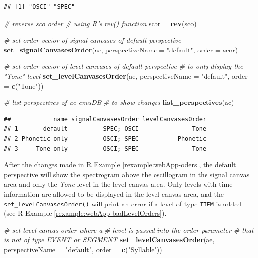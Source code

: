 \documentclass[]{book}
\newenvironment{Shaded}{\begin{snugshade}}{\end{snugshade}}
\newcommand{\CommentTok}[1]{\textcolor[rgb]{0.56,0.35,0.01}{\textit{#1}}}
\newcommand{\DataTypeTok}[1]{\textcolor[rgb]{0.13,0.29,0.53}{#1}}
\newcommand{\KeywordTok}[1]{\textcolor[rgb]{0.13,0.29,0.53}{\textbf{#1}}}
\newcommand{\NormalTok}[1]{#1}
\newcommand{\StringTok}[1]{\textcolor[rgb]{0.31,0.60,0.02}{#1}}
\theoremstyle{definition}
\theoremstyle{definition}
\theoremstyle{definition}
\theoremstyle{remark}
\begin{document}
\begin{verbatim}
## [1] "OSCI" "SPEC"
\end{verbatim}

\begin{Shaded}
\begin{Highlighting}[]
\CommentTok{# reverse sco order}
\CommentTok{# using R's rev() function}
\NormalTok{scor =}\StringTok{ }\KeywordTok{rev}\NormalTok{(sco)}

\CommentTok{# set order vector of signal canvases of default perspective}
\KeywordTok{set_signalCanvasesOrder}\NormalTok{(ae,}
                        \DataTypeTok{perspectiveName =} \StringTok{"default"}\NormalTok{,}
                        \DataTypeTok{order =}\NormalTok{ scor)}

\CommentTok{# set order vector of level canvases of default perspective}
\CommentTok{# to only display the "Tone" level}
\KeywordTok{set_levelCanvasesOrder}\NormalTok{(ae,}
                       \DataTypeTok{perspectiveName =} \StringTok{"default"}\NormalTok{,}
                       \DataTypeTok{order =} \KeywordTok{c}\NormalTok{(}\StringTok{"Tone"}\NormalTok{))}

\CommentTok{# list perspectives of ae emuDB}
\CommentTok{# to show changes}
\KeywordTok{list_perspectives}\NormalTok{(ae)}
\end{Highlighting}
\end{Shaded}

\begin{verbatim}
##            name signalCanvasesOrder levelCanvasesOrder
## 1       default          SPEC; OSCI               Tone
## 2 Phonetic-only          OSCI; SPEC           Phonetic
## 3     Tone-only          OSCI; SPEC               Tone
\end{verbatim}

After the changes made in R Example \ref{rexample:webApp-oders}, the
default perspective will show the spectrogram above the oscillogram in
the signal canvas area and only the \emph{Tone} level in the level
canvas area. Only levels with time information are allowed to be
displayed in the level canvas area, and the
\texttt{set\_levelCanvasesOrder()} will print an error if a level of
type \texttt{ITEM} is added (see R Example
\ref{rexample:webApp-badLevelOrders}).

\begin{Shaded}
\begin{Highlighting}[]
\CommentTok{# set level canvas order where a}
\CommentTok{# level is passed into the order parameter}
\CommentTok{# that is not of type EVENT or SEGMENT}
\KeywordTok{set_levelCanvasesOrder}\NormalTok{(ae,}
                       \DataTypeTok{perspectiveName =} \StringTok{"default"}\NormalTok{,}
                       \DataTypeTok{order =} \KeywordTok{c}\NormalTok{(}\StringTok{"Syllable"}\NormalTok{))}
\end{Highlighting}
\end{Shaded}
\end{document}
